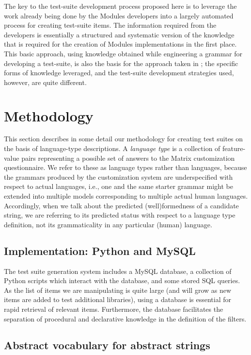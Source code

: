 \documentclass[11pt]{article}
\begin{document}
The key to the test-suite development process proposed here is to
leverage the work already being done by the Modules developers into a
largely automated process for creating test-suite items. The
information required from the developers is essentially a structured
and systematic version of the knowledge that is required for the
creation of Modules implementations in the first place.  This basic
approach, using knowledge obtained while engineering a grammar for
developing a test-suite, is also the basis for the approach taken in
\cite{bro:00}; the specific forms of knowledge leveraged, and the
test-suite development strategies used, however, are quite different.



\section{Methodology}
\label{arch}

This section describes in some detail our methodology for creating
test suites on the basis of language-type descriptions.  A {\it
language type} is a collection of feature-value pairs representing a
possible set of answers to the Matrix customization questionnaire. We
refer to these as language types rather than languages, because the
grammars produced by the customization system are underspecified with
respect to actual languages, i.e., one and the same starter grammar
might be extended into multiple models corresponding to multiple
actual human languages.  Accordingly, when we talk about the predicted
(well)formedness of a candidate string, we are referring to its
predicted status with respect to a language type definition, not its
grammaticality in any particular (human) language.

\subsection{Implementation: Python and MySQL}

The test suite generation system includes a MySQL database, a collection
of Python scripts which interact with the database, and some stored
SQL queries.  As the list of items we are manipulating is quite large
(and will grow as new items are added to test additional libraries),
using a database is essential for rapid retrieval of relevant items.
Furthermore, the database facilitates the separation of procedural
and declarative knowledge in the definition of the filters.

\subsection{Abstract vocabulary for abstract strings}
\end{document}
